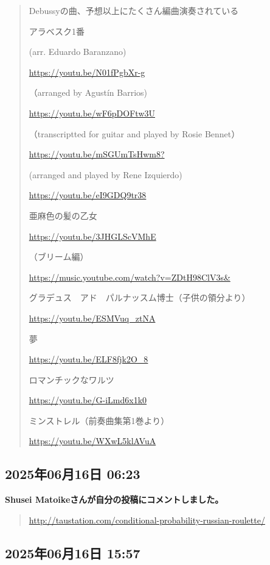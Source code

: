\begin{quote}
Debussyの曲、予想以上にたくさん編曲演奏されている

アラベスク1番

(arr. Eduardo Baranzano)

\url{https://youtu.be/N01fPgbXr-g}

（arranged by Agustín Barrios)

\url{https://youtu.be/wF6pDOFtw3U}

（transcriptted for guitar and played by Rosie Bennet）

\url{https://youtu.be/mSGUmTsHwm8?}

(arranged and played by Rene Izquierdo)

\url{https://youtu.be/eI9GDQ9tr38}

亜麻色の髪の乙女

\url{https://youtu.be/3JHGLScVMhE}

（ブリーム編）

\url{https://music.youtube.com/watch?v=ZDtH98ClV3s&}

グラデュス　アド　パルナッスム博士（子供の領分より）

\url{https://youtu.be/ESMVuq_ztNA}

夢

\url{https://youtu.be/ELF8fjk2O_8}

ロマンチックなワルツ

\url{https://youtu.be/G-iLmd6x1k0}

ミンストレル（前奏曲集第1巻より）

\url{https://youtu.be/WXwL5klAVuA}
\end{quote}

\subsection*{2025年06月16日 06:23}

\textbf{Shusei Matoikeさんが自分の投稿にコメントしました。}

\begin{quote}
\url{http://taustation.com/conditional-probability-russian-roulette/}
\end{quote}

\subsection*{2025年06月16日 15:57}

